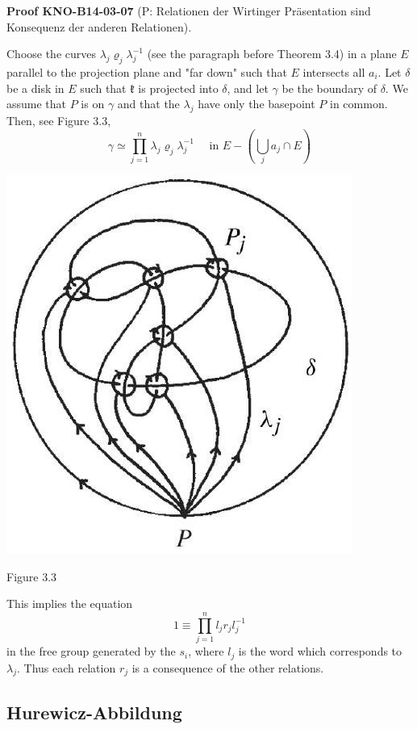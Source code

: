 \documentclass[10pt, letterpaper]{article}
\newcommand{\CustomHeading}[3]{%
  \par\medskip\noindent%
  \textbf{#1 #2} \textnormal{(#3)}.\enskip%
}
\newenvironment{PROOF}[2]{\CustomHeading{Proof}{#1}{#2}}{}
\begin{document}
\begin{PROOF}{KNO-B14-03-07}{P: Relationen der Wirtinger Präsentation sind Konsequenz der anderen Relationen}
Choose the curves $\lambda_{j} \varrho_{j} \lambda_{j}^{-1}$ (see the paragraph before Theorem 3.4) in a plane $E$ parallel to the projection plane and "far down" such that $E$ intersects all $a_{i}$. Let $\delta$ be a disk in $E$ such that $\mathfrak{k}$ is projected into $\delta$, and let $\gamma$ be the boundary of $\delta$. We assume that $P$ is on $\gamma$ and that the $\lambda_{j}$ have only the basepoint $P$ in common. Then, see Figure 3.3,
$$
\gamma \simeq \prod_{j=1}^{n} \lambda_{j} \varrho_{j} \lambda_{j}^{-1} \quad \text { in } E-\left(\bigcup_{j} a_{j} \cap E\right)
$$
\begin{center}
\includegraphics[scale=0.2]{2025_05_21_9c06be8de7a55410f8c1g-049}
\end{center}
Figure 3.3

This implies the equation
$$
1 \equiv \prod_{j=1}^{n} l_{j} r_{j} l_{j}^{-1}
$$
in the free group generated by the $s_{i}$, where $l_{j}$ is the word which corresponds to $\lambda_{j}$. Thus each relation $r_{j}$ is a consequence of the other relations.
\end{PROOF}

\subsection{Hurewicz-Abbildung}
\end{document}
